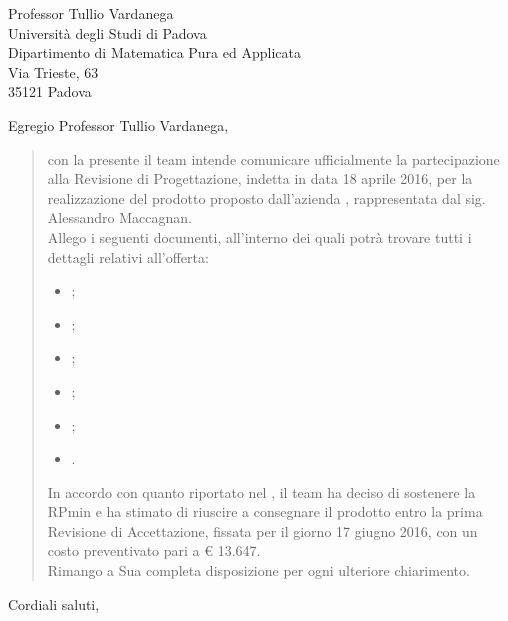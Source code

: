 \date{Padova, 11 Aprile 2016}
\begin{letter}{
	Professor Tullio Vardanega \\
	Università degli Studi di Padova \\
	Dipartimento di Matematica Pura ed Applicata \\
	Via Trieste, 63 \\
	35121 Padova
}
\signature{
\begin{center}
\textit{
\Responsabile{} \\
Responsabile \GroupName{}
}
\texttt{[image: res/MatteoDiPirro.png]}
\end{center}
}
\opening{Egregio Professor Tullio Vardanega,}
\begin{quotation}
con la presente il team \GroupName{} intende comunicare ufficialmente la partecipazione alla Revisione di Progettazione, indetta in data 18 aprile 2016, per la realizzazione del prodotto \ProjectName{} proposto dall'azienda \Proponente, rappresentata dal sig. Alessandro Maccagnan. \\
Allego i seguenti documenti, all'interno dei quali potrà trovare tutti i dettagli relativi all'offerta:
\begin{itemize}
\item \AnalisiDeiRequisiti{};
\item \Glossario{};
\item \NormeDiProgetto{};
\item \PianoDiProgetto{};
\item \PianoDiQualifica{};
\item \SpecificaTecnica{}.
\end{itemize}
In accordo con quanto riportato nel \PianoDiProgetto, il team ha deciso di sostenere la RPmin e ha stimato di riuscire a consegnare il prodotto entro la prima Revisione di Accettazione, fissata per il giorno 17 giugno 2016, con un costo preventivato pari a \euro{} 13.647. \\
Rimango a Sua completa disposizione per ogni ulteriore chiarimento.
\end{quotation}
\closing{Cordiali saluti,}
\end{letter}
